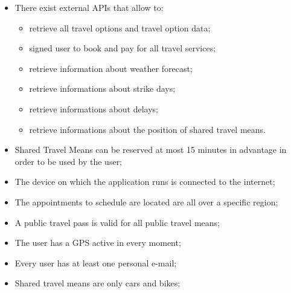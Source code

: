 \begin{itemize}

\item There exist external APIs that allow to:
\begin{itemize}
\item retrieve all travel options and travel option data;
\item signed user to book and pay for all travel services;
\item retrieve information about weather forecast;
\item retrieve informations about strike days;
\item retrieve informations about delays;
\item retrieve informations about the position of shared travel means.
\end{itemize}

\item Shared Travel Means can be reserved at most 15 minutes in advantage in order to be used by the user;

\item The device on which the application runs is connected to the internet;

\item The appointments to schedule are located are all over a specific region;

\item A public travel pass is valid for all public travel means;

\item The user has a GPS active in every moment;

\item Every user has at least one personal e-mail;

\item Shared travel means are only cars and bikes;


\end{itemize}




